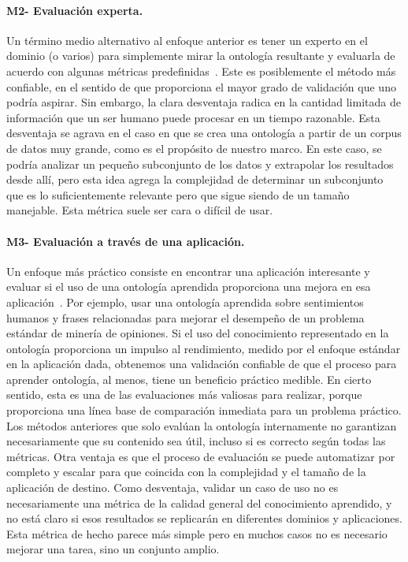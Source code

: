     \paragraph{M2- Evaluación experta.}
    Un término medio alternativo al enfoque anterior es tener un experto en el dominio (o varios) para simplemente mirar la ontología resultante y evaluarla de acuerdo con algunas métricas predefinidas~\cite{ROSPOCHER2016132}.
    Este es posiblemente el método más confiable, en el sentido de que proporciona el mayor grado de validación que uno podría aspirar.
    Sin embargo, la clara desventaja radica en la cantidad limitada de información que un ser humano puede procesar en un tiempo razonable.
    Esta desventaja se agrava en el caso en que se crea una ontología a partir de un corpus de datos muy grande, como es el propósito de nuestro marco.
    En este caso, se podría analizar un pequeño subconjunto de los datos y extrapolar los resultados desde allí, pero esta idea agrega la complejidad de determinar un subconjunto que es lo suficientemente relevante pero que sigue siendo de un tamaño manejable.
    Esta métrica suele ser cara o difícil de usar.

    \paragraph{M3- Evaluación a través de una aplicación.}
    Un enfoque más práctico consiste en encontrar una aplicación interesante y evaluar si el uso de una ontología aprendida proporciona una mejora en esa aplicación~\cite{gurevych2003semantic}.
    Por ejemplo, usar una ontología aprendida sobre sentimientos humanos y frases relacionadas para mejorar el desempeño de un problema estándar de minería de opiniones.
    Si el uso del conocimiento representado en la ontología proporciona un impulso al rendimiento, medido por el enfoque estándar en la aplicación dada, obtenemos una validación confiable de que el proceso para aprender ontología, al menos, tiene un beneficio práctico medible.
    En cierto sentido, esta es una de las evaluaciones más valiosas para realizar, porque proporciona una línea base de comparación inmediata para un problema práctico.
    Los métodos anteriores que solo evalúan la ontología internamente no garantizan necesariamente que su contenido sea útil, incluso si es correcto según todas las métricas.
    Otra ventaja es que el proceso de evaluación se puede automatizar por completo y escalar para que coincida con la complejidad y el tamaño de la aplicación de destino.
    Como desventaja, validar un caso de uso no es necesariamente una métrica de la calidad general del conocimiento aprendido, y no está claro si esos resultados se replicarán en diferentes dominios y aplicaciones.
    Esta métrica de hecho parece más simple pero en muchos casos no es necesario mejorar una tarea, sino un conjunto amplio.

